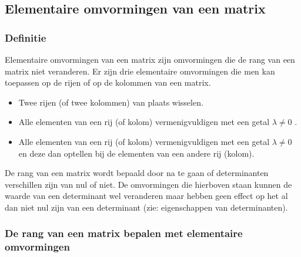 \subsection{Elementaire omvormingen van een matrix}

\subsubsection{Definitie}

	
\begin{definitie}
	Elementaire omvormingen van een matrix zijn omvormingen die de rang van een matrix niet veranderen. Er zijn drie elementaire omvormingen die men kan toepassen op de rijen of op de kolommen van een matrix.
\begin{itemize}
	\item Twee rijen (of twee kolommen) van plaats wisselen.
	\item Alle elementen van een rij (of kolom) vermenigvuldigen met een getal $\lambda \neq 0$ .
	\item Alle elementen van een rij (of kolom) vermenigvuldigen met een getal $\lambda \neq 0$ en deze dan optellen bij de elementen van een andere rij (kolom).
\end{itemize}

\end{definitie}


\begin{opmerking}
De rang van een matrix wordt bepaald door na te gaan of  determinanten verschillen zijn van nul of niet. De omvormingen die hierboven staan kunnen de waarde van een determinant wel veranderen maar hebben geen effect op het al dan niet nul zijn van een determinant (zie: eigenschappen van determinanten).
\end{opmerking}

\subsubsection{De rang van een matrix bepalen met elementaire omvormingen}

